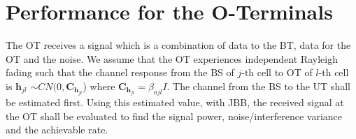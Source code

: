 \documentclass[10pt, a4paper, twoside,fleqn]{article}
\begin{document}

\section{Performance for the O-Terminals}
	The OT receives a signal which is a combination of data to the BT, data for the OT and the noise. We assume that the OT experiences independent Rayleigh fading such that the channel response from the BS of $j$-th cell to OT of $l$-th cell is $\pmb{h}_{jl}$ $\sim CN(0,\pmb{C}_{\pmb{h}_{jl}}$) where $\pmb{C}_{\pmb{h}_{jl}} = \beta_{ojl}I$. The channel from the BS to the UT shall be estimated first. Using this estimated value, with JBB, the received signal at the OT shall be evaluated to find the signal power, noise/interference variance and the achievable rate.
\end{document}
